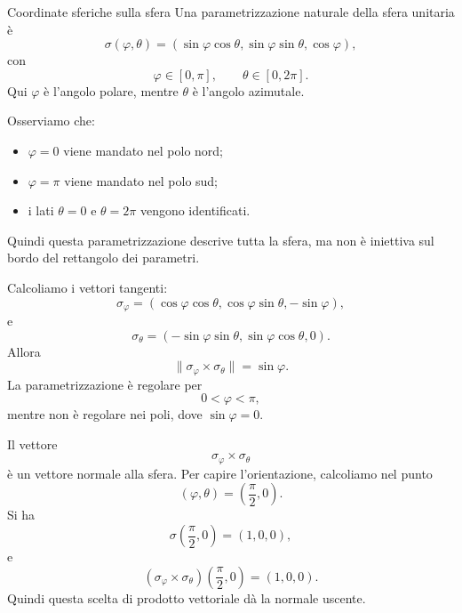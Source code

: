 \documentclass[a4paper]{article}
\begin{document}
\begin{snippetexample}{Coordinate sferiche sulla sfera}
    Una parametrizzazione naturale della sfera unitaria è
    \[
        \sigma(\varphi,\theta)
        =
        \left(
            \sin\varphi\cos\theta,
            \sin\varphi\sin\theta,
            \cos\varphi
        \right),
    \]
    con
    \[
        \varphi\in[0,\pi],
        \qquad
        \theta\in[0,2\pi].
    \]
    Qui \(\varphi\) è l'angolo polare, mentre \(\theta\) è l'angolo azimutale.

    Osserviamo che:
    \begin{itemize}
        \item \(\varphi=0\) viene mandato nel polo nord;
        \item \(\varphi=\pi\) viene mandato nel polo sud;
        \item i lati \(\theta=0\) e \(\theta=2\pi\) vengono identificati.
    \end{itemize}
    Quindi questa parametrizzazione descrive tutta la sfera, ma non è iniettiva sul bordo del rettangolo dei parametri.

    Calcoliamo i vettori tangenti:
    \[
        \sigma_\varphi
        =
        \left(
            \cos\varphi\cos\theta,
            \cos\varphi\sin\theta,
            -\sin\varphi
        \right),
    \]
    e
    \[
        \sigma_\theta
        =
        \left(
            -\sin\varphi\sin\theta,
            \sin\varphi\cos\theta,
            0
        \right).
    \]
    Allora
    \[
        \|\sigma_\varphi\times\sigma_\theta\|
        =
        \sin\varphi.
    \]
    La parametrizzazione è regolare per
    \[
        0<\varphi<\pi,
    \]
    mentre non è regolare nei poli, dove \(\sin\varphi=0\).

    \begin{center}
    \end{center}

    Il vettore
    \[
        \sigma_\varphi\times\sigma_\theta
    \]
    è un vettore normale alla sfera. Per capire l'orientazione, calcoliamo nel punto
    \[
        (\varphi,\theta)=\left(\frac{\pi}{2},0\right).
    \]
    Si ha
    \[
        \sigma\left(\frac{\pi}{2},0\right)=(1,0,0),
    \]
    e
    \[
        \left(\sigma_\varphi\times\sigma_\theta\right)
        \left(\frac{\pi}{2},0\right)
        =
        (1,0,0).
    \]
    Quindi questa scelta di prodotto vettoriale dà la normale uscente.
\end{snippetexample}
\end{document}
